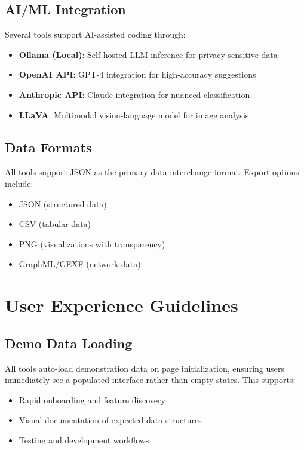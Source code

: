 \subsection{AI/ML Integration}

Several tools support AI-assisted coding through:
\begin{itemize}
    \item \textbf{Ollama (Local)}: Self-hosted LLM inference for privacy-sensitive data
    \item \textbf{OpenAI API}: GPT-4 integration for high-accuracy suggestions
    \item \textbf{Anthropic API}: Claude integration for nuanced classification
    \item \textbf{LLaVA}: Multimodal vision-language model for image analysis
\end{itemize}

\subsection{Data Formats}

All tools support JSON as the primary data interchange format. Export options include:
\begin{itemize}
    \item JSON (structured data)
    \item CSV (tabular data)
    \item PNG (visualizations with transparency)
    \item GraphML/GEXF (network data)
\end{itemize}

\section{User Experience Guidelines}

\subsection{Demo Data Loading}

All tools auto-load demonstration data on page initialization, ensuring users immediately see a populated interface rather than empty states. This supports:
\begin{itemize}
    \item Rapid onboarding and feature discovery
    \item Visual documentation of expected data structures
    \item Testing and development workflows
\end{itemize}

